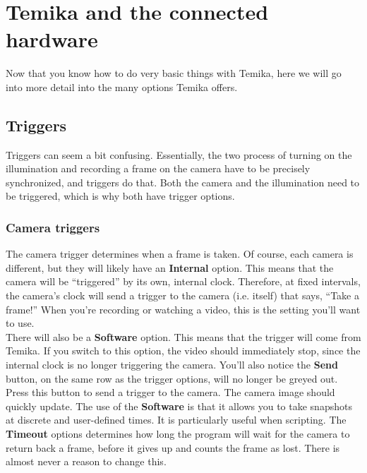 \documentclass{report}
\begin{document}
\newpage

\chapter{Temika and the connected hardware}

Now that you know how to do very basic things with Temika, here we will go into more detail into the many options Temika offers.


\section{Triggers}

Triggers can seem a bit confusing. Essentially, the two process of turning on the illumination and recording a frame on the camera have to be precisely synchronized, and triggers do that.     Both the camera and the illumination need to be triggered, which is why both have trigger options.\\

\subsection{Camera triggers}

The camera trigger determines when a frame is taken. Of course, each camera is different, but they will likely have an \textbf{Internal} option. This means that the camera will be ``triggered'' by its own, internal clock. Therefore, at fixed intervals, the camera's clock will send a trigger to the camera (i.e. itself) that says, ``Take a frame!'' When you're recording or watching a video, this is the setting you'll want to use.\\

There will also be a \textbf{Software} option. This means that the trigger will come from Temika. If you switch to this option, the video should immediately stop, since the internal clock is no longer triggering the camera. You'll also notice the \textbf{Send} button, on the same row as the trigger options, will no longer be greyed out. Press this button to send a trigger to the camera. The camera image should quickly update. The use of the \textbf{Software} is that it allows you to take snapshots at discrete and user-defined times. It is particularly useful when scripting. The \textbf{Timeout} options determines how long the program will wait for the camera to return back a frame, before it gives up and counts the frame as lost. There is almost never a reason to change this.\\
\end{document}
